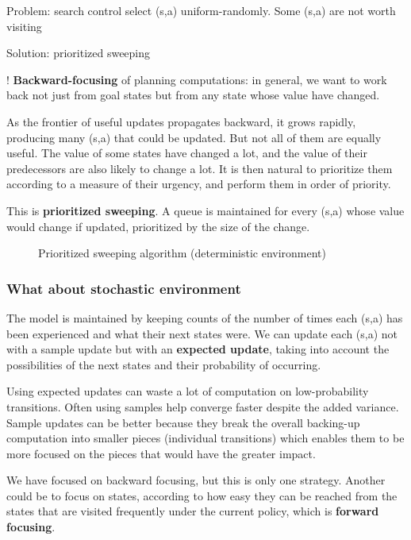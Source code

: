 \documentclass[sutton_barto_notes.tex]{subfiles}
\begin{document}
Problem: search control select (s,a) uniform-randomly. Some (s,a) are not worth visiting

Solution: prioritized sweeping

! \textbf{Backward-focusing } of planning computations: in general, we want to work back not just from goal states but from any state whose value have changed.

As the frontier of useful updates propagates backward, it grows rapidly, producing many (s,a) that could be updated. But not all of them are equally useful. The value of some states have changed a lot, and the value of their predecessors are also likely to change a lot. It is then natural to prioritize them according to a measure of their urgency, and perform them in order of priority.

This is \textbf{prioritized sweeping}. A queue is maintained for every (s,a) whose value would change if updated, prioritized by the size of the change.

\begin{figure}[h!]
    \centering
    \caption{ Prioritized sweeping algorithm (deterministic environment) }
\end{figure}



\subsubsection{What about stochastic environment}

The model is maintained by keeping counts of the number of times each (s,a) has been experienced and what their next states were. We can update each (s,a) not with a sample update but with an \textbf{expected update}, taking into account the possibilities of the next states and their probability of occurring.

Using expected updates can waste a lot of computation on low-probability transitions. Often using samples help converge faster despite the added variance. Sample updates can be better because they break the overall backing-up computation into smaller pieces (individual transitions) which enables them to be more focused on the pieces that would have the greater impact.



We have focused on backward focusing, but this is only one strategy. Another could be to focus on states, according to how easy they can be reached from the states that are visited frequently under the current policy, which is \textbf{forward focusing}.
\end{document}
